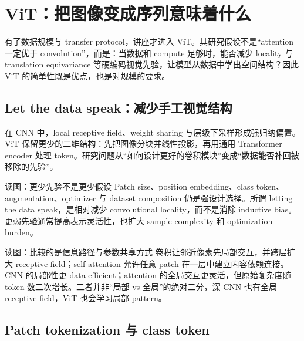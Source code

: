\section{ViT：把图像变成序列意味着什么}

有了数据规模与 transfer protocol，讲座才进入 ViT。其研究假设不是“attention 一定优于 convolution”，而是：当数据和 compute 足够时，能否减少 locality 与 translation equivariance 等硬编码视觉先验，让模型从数据中学出空间结构？因此 ViT 的简单性既是优点，也是对规模的要求。

\subsection{Let the data speak：减少手工视觉结构}

在 CNN 中，local receptive field、weight sharing 与层级下采样形成强归纳偏置。ViT 保留更少的二维结构：先把图像分块并线性投影，再用通用 Transformer encoder 处理 token。研究问题从“如何设计更好的卷积模块”变成“数据能否补回被移除的先验”。


\begin{knowledgebox}{读图：更少先验不是更少假设}
Patch size、position embedding、class token、augmentation、optimizer 与 dataset composition 仍是强设计选择。所谓 letting the data speak，是相对减少 convolutional locality，而不是消除 inductive bias。更弱先验通常提高表示灵活性，也扩大 sample complexity 和 optimization burden。
\end{knowledgebox}


\begin{knowledgebox}{读图：比较的是信息路径与参数共享方式}
卷积让邻近像素先局部交互，并跨层扩大 receptive field；self-attention 允许任意 patch 在一层中建立内容依赖连接。CNN 的局部性更 data-efficient；attention 的全局交互更灵活，但原始复杂度随 token 数二次增长。二者并非“局部 vs 全局”的绝对二分，深 CNN 也有全局 receptive field，ViT 也会学习局部 pattern。
\end{knowledgebox}

\subsection{Patch tokenization 与 class token}

